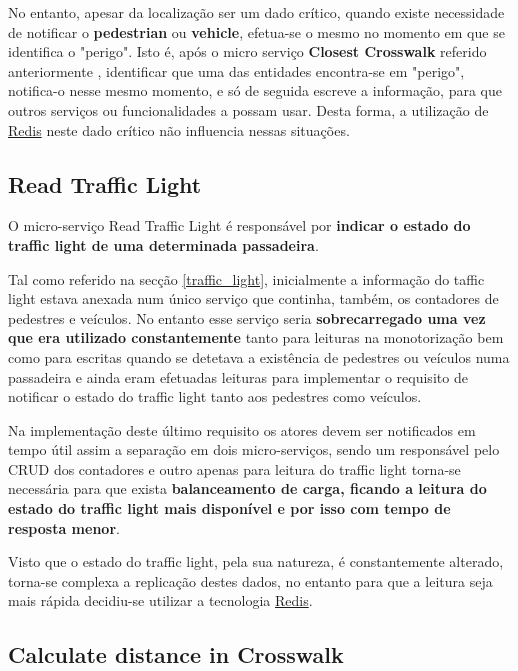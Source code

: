 \documentclass[acmsmall,nonacm,screen]{acmart}
\begin{document}
\hspace{5mm} No entanto, apesar da localização ser um dado crítico, quando existe necessidade de notificar o \textbf{pedestrian} ou \textbf{vehicle}, efetua-se o mesmo no momento em que se identifica o "perigo". Isto é, após o micro serviço \textbf{Closest Crosswalk} referido anteriormente , identificar que uma das entidades encontra-se em "perigo", notifica-o nesse mesmo momento, e só de seguida escreve a informação, para que outros serviços ou funcionalidades a possam usar. Desta forma, a utilização de \href{https://redis.io/}{Redis} neste dado crítico não influencia nessas situações.


\subsection{Read Traffic Light}

\hspace{5mm} O micro-serviço Read Traffic Light é responsável por \textbf{indicar o estado do traffic light de uma determinada passadeira}. 

\hspace{5mm} Tal como referido na secção \ref{traffic_light}, inicialmente a informação do taffic light estava anexada num único serviço que continha, também, os contadores de pedestres e veículos. No entanto esse serviço seria \textbf{sobrecarregado uma vez que era utilizado constantemente} tanto para leituras na monotorização bem como para escritas quando se detetava a existência de pedestres ou veículos numa passadeira e ainda eram efetuadas leituras para implementar o requisito de notificar o estado do traffic light tanto aos pedestres como veículos. 

\hspace{5mm} Na implementação deste último requisito os atores devem ser notificados em tempo útil assim a separação em dois micro-serviços, sendo um responsável pelo CRUD dos contadores e outro apenas para leitura do traffic light torna-se necessária para que exista \textbf{balanceamento de carga, ficando a leitura do estado do traffic light mais disponível e por isso com tempo de resposta menor}.

\hspace{5mm} Visto que o estado do traffic light, pela sua natureza, é constantemente alterado, torna-se complexa a replicação destes dados, no entanto para que a leitura seja mais rápida decidiu-se utilizar a tecnologia \href{https://redis.io/}{Redis}.


\subsection{Calculate distance in Crosswalk}
\end{document}
